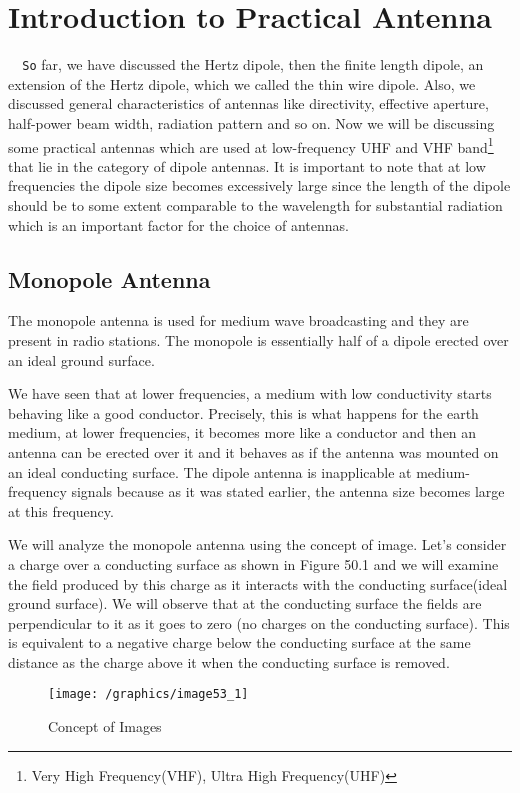 \chapter{Introduction to Practical Antenna}
\verb|	So| far, we have discussed the Hertz dipole, then the finite length dipole, an extension of the Hertz dipole, which we called the thin wire dipole. Also, we discussed general characteristics of antennas like directivity, effective aperture, half-power beam width, radiation pattern and so on. Now we will be discussing some practical antennas which are used at low-frequency UHF and VHF band\footnote{Very High Frequency(VHF), Ultra High Frequency(UHF)} that lie in the category of dipole antennas. It is important to note that at low frequencies the dipole size becomes excessively large since the length of the dipole should be to some extent comparable to the wavelength for substantial radiation which is an important factor for the choice of antennas.


\section{Monopole Antenna}The monopole antenna is used for medium wave broadcasting and they are present in radio stations. The monopole is essentially half of a dipole erected over an ideal ground surface.

We have seen that at lower frequencies, a medium with low conductivity starts behaving like a good conductor. Precisely, this is what happens for the earth medium, at lower frequencies, it becomes more like a conductor and then an antenna can be erected over it and it behaves as if the antenna was mounted on an ideal conducting surface. The dipole antenna is inapplicable at medium-frequency signals because as it was stated earlier, the antenna size becomes large at this frequency.

We will analyze the monopole antenna using the concept of image. Let's consider a charge over a conducting surface as shown in Figure 50.1 and we will examine the field produced by this charge as it interacts with the conducting surface(ideal ground surface). We will observe that at the conducting surface the fields are perpendicular to it as it goes to zero (no charges on the conducting surface). This is equivalent to a negative charge below the conducting surface at the same distance as the charge above it when the conducting surface is removed. 
\begin{figure}[h]
\centering
\texttt{[image: /graphics/image53\_1]}
\caption{Concept of Images}
\label{fig:fig50.1}
\end{figure}

